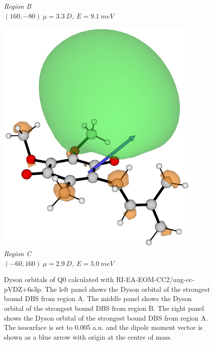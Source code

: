\begin{figure}[h]
\begin{minipage}[b]{0.30\textwidth}
      \small\emph{Region B \\$(160,-80)~\mu=3.3~D$, $E=9.1~meV$}
  \end{minipage}
  \hfill
  \begin{minipage}[b]{0.30\textwidth}
    \centering
    \includegraphics[width=0.9\textwidth]{chapters/results/image/Q1_112.png}
    \small\emph{Region C \\$(-60,160)~\mu=2.9~D$, $E=5.0~meV$}
  \end{minipage}
  \caption[Dyson orbitals of Q1]{Dyson orbitals of Q0 calculated with RI-EA-EOM-CC2/aug-cc-pVDZ+6s3p. The left panel shows the Dyson orbital of the strongest bound DBS from region A. The middle panel shows the Dyson orbital of the strongest bound DBS from region B. The right panel shows the Dyson orbital of the strongest bound DBS from region A. The isosurface is set to 0.005 a.u. and the dipole moment vector is shown as a blue arrow with origin at the centre of mass.}
  \label{fig:Q1_dyson}
\end{figure}


